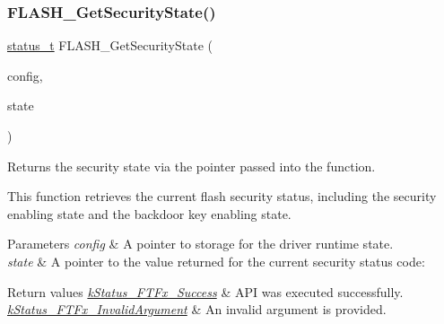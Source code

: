\subsubsection{\texorpdfstring{FLASH\_GetSecurityState()}{FLASH\_GetSecurityState()}}
{\footnotesize\ttfamily \mbox{\hyperlink{group__ksdk__common_gaaabdaf7ee58ca7269bd4bf24efcde092}{status\+\_\+t}} F\+L\+A\+S\+H\+\_\+\+Get\+Security\+State (\begin{DoxyParamCaption}\item[{\mbox{\hyperlink{group__ftfx__flash__driver_ga0dfc969e6f9e17c17e60d823565141a5}{flash\+\_\+config\+\_\+t}} $\ast$}]{config,  }\item[{\mbox{\hyperlink{group__ftfx__controller_gae49df85d158f3651e17d1bb660a4f1c2}{ftfx\+\_\+security\+\_\+state\+\_\+t}} $\ast$}]{state }\end{DoxyParamCaption})}



Returns the security state via the pointer passed into the function. 

This function retrieves the current flash security status, including the security enabling state and the backdoor key enabling state.


\begin{DoxyParams}{Parameters}
{\em config} & A pointer to storage for the driver runtime state. \\
\hline
{\em state} & A pointer to the value returned for the current security status code\+:\\
\hline
\end{DoxyParams}

\begin{DoxyRetVals}{Return values}
{\em \mbox{\hyperlink{group__ftfx__controller_gga458e651af6690959efa2afb96be7d609a8825e5cb3b30edfd6a26897eef4c66a3}{k\+Status\+\_\+\+F\+T\+Fx\+\_\+\+Success}}} & A\+PI was executed successfully. \\
\hline
{\em \mbox{\hyperlink{group__ftfx__controller_gga458e651af6690959efa2afb96be7d609a88aadd667559399a26dcb825bf0b8d3e}{k\+Status\+\_\+\+F\+T\+Fx\+\_\+\+Invalid\+Argument}}} & An invalid argument is provided. \\
\hline
\end{DoxyRetVals}
\mbox{\label{group__ftfx__flash__driver_ga19c10d3524010a2d33369855d74a5c04}} 
